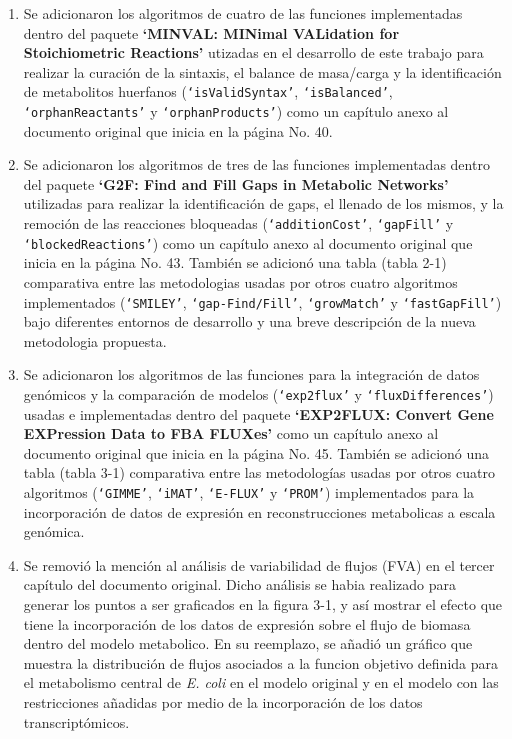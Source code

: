 \documentclass[12pt,a4paper]{article}
\begin{document}
\begin{enumerate}
\item Se adicionaron los algoritmos de cuatro de las  funciones implementadas dentro del paquete \textbf{`MINVAL: MINimal VALidation for Stoichiometric Reactions'} utizadas en el desarrollo de este trabajo para realizar la curación de la sintaxis, el balance de masa/carga y  la identificación de metabolitos huerfanos (\texttt{`isValidSyntax'}, \texttt{`isBalanced'}, \texttt{`orphanReactants'} y \texttt{`orphanProducts'}) como un capítulo anexo al documento original que inicia en la página No. 40.

\item Se adicionaron los algoritmos de tres de las funciones implementadas dentro del paquete \textbf{`G2F: Find and Fill Gaps in Metabolic Networks'} utilizadas para realizar la identificación de gaps, el llenado de los mismos, y la remoción de las reacciones bloqueadas (\texttt{`additionCost'}, \texttt{`gapFill'} y \texttt{`blockedReactions'}) como un capítulo anexo al documento original que inicia en la página No. 43. También se adicionó una tabla (tabla 2-1) comparativa entre las metodologias usadas por otros cuatro algoritmos implementados (\texttt{`SMILEY'}, \texttt{`gap-Find/Fill'}, \texttt{`growMatch'} y \texttt{`fastGapFill'}) bajo diferentes entornos de desarrollo y una breve descripción de la nueva metodologia propuesta.

\item Se adicionaron los algoritmos de las funciones para la integración de datos genómicos y la comparación de modelos  (\texttt{`exp2flux'} y \texttt{`fluxDifferences'}) usadas e implementadas dentro del paquete \textbf{`EXP2FLUX: Convert Gene EXPression Data to FBA FLUXes'} como un capítulo anexo al documento original que inicia en la página No. 45. También se adicionó una tabla (tabla 3-1) comparativa entre las metodologías usadas por otros cuatro algoritmos (\texttt{`GIMME'}, \texttt{`iMAT'}, \texttt{`E-FLUX'} y \texttt{`PROM'}) implementados para la incorporación de datos de expresión en reconstrucciones metabolicas a escala genómica.

\item Se removió la mención al análisis de variabilidad de flujos (FVA) en el tercer capítulo del documento original. Dicho análisis se habia realizado para generar los puntos a ser graficados en la figura 3-1, y así mostrar el efecto que tiene la incorporación de los datos de expresión sobre el flujo de biomasa dentro del modelo metabolico. En su reemplazo, se añadió un gráfico que muestra la distribución de flujos asociados a la funcion objetivo definida para el metabolismo central de \textit{E. coli} en el modelo original y en el modelo con las restricciones añadidas por medio de la incorporación de los datos transcriptómicos.


\end{enumerate}
\end{document}

